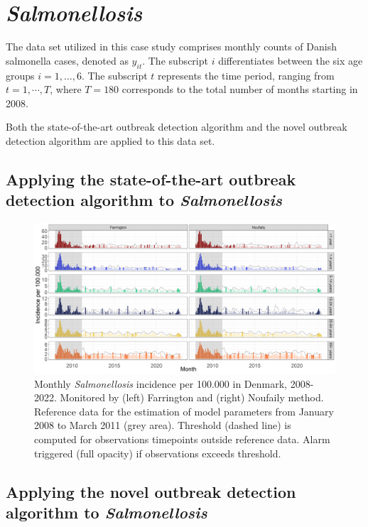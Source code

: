 \documentclass[a4paper,twoside,11pt]{report} %
\theoremstyle{definition}
\theoremstyle{definition}
\theoremstyle{definition}
\theoremstyle{definition}
\theoremstyle{remark}
\begin{document}
\section{\textit{Salmonellosis}}

The data set utilized in this case study comprises monthly counts of Danish salmonella cases, denoted as \(y_{it}\). The subscript \(i\) differentiates between the six age groups \(i=1,\dots,6\). The subscript \(t\) represents the time period, ranging from \(t = 1,\cdots, T\), where \(T = 180\) corresponds to the total number of months starting in 2008.

Both the state-of-the-art outbreak detection algorithm and the novel outbreak detection algorithm are applied to this data set.

\subsection{Applying the state-of-the-art outbreak detection algorithm to \textit{Salmonellosis}}



\begin{figure}[H]
\includegraphics[width=1\linewidth]{../figures/Compare_stateOfTheArt_SALM} \caption{Monthly \textit{Salmonellosis} incidence per 100.000 in Denmark, 2008-2022. Monitored by (left) Farrington and (right) Noufaily method. Reference data for the estimation of model parameters from January 2008 to March 2011 (grey area). Threshold (dashed line) is computed for observations timepoints outside reference data. Alarm triggered (full opacity) if observations exceeds threshold.}\label{fig:CompareStateOfTheArtSALM}
\end{figure}

\subsection{Applying the novel outbreak detection algorithm to \textit{Salmonellosis}}
\end{document}
